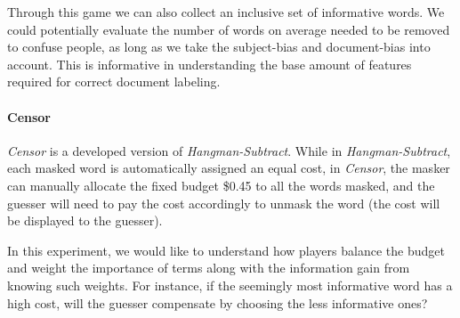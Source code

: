 \documentclass[chi_draft]{sigchi}
\begin{document}
Through this game we can also collect an inclusive set of informative words. We could potentially evaluate the number of words on average needed to be removed to confuse people, as long as we take the subject-bias and document-bias into account. This is informative in understanding the base amount of features required for correct document labeling.

\paragraph{Censor}
\emph{Censor} is a developed version of \emph{Hangman-Subtract}. 
While in \emph{Hangman-Subtract}, each masked word is automatically assigned an equal cost, in \emph{Censor}, the masker can manually allocate the fixed budget \$0.45 to all the words masked, and the guesser will need to pay the cost accordingly to unmask the word (the cost will be displayed to the guesser). 

In this experiment, we would like to understand how players balance the budget and weight the importance of terms along with the information gain from knowing such weights. For instance, if the seemingly most informative word has a high cost, will the guesser compensate by choosing the less informative ones? 
\end{document}
